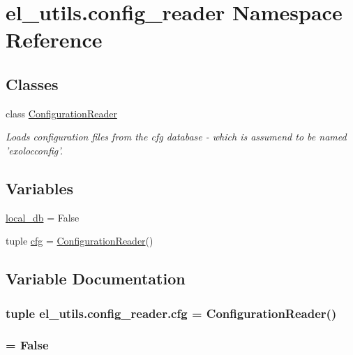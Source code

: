 \hypertarget{namespaceel__utils_1_1config__reader}{\section{el\-\_\-utils.\-config\-\_\-reader Namespace Reference}
\label{namespaceel__utils_1_1config__reader}
}
\subsection*{Classes}
\begin{DoxyCompactItemize}
\item 
class \hyperlink{classel__utils_1_1config__reader_1_1ConfigurationReader}{Configuration\-Reader}
\begin{DoxyCompactList}\small\item\em Loads configuration files from the cfg database -\/ which is assumend to be named 'exolocconfig'. \end{DoxyCompactList}\end{DoxyCompactItemize}
\subsection*{Variables}
\begin{DoxyCompactItemize}
\item 
\hyperlink{namespaceel__utils_1_1config__reader_a659c79c49945310345883c20baecf8ff}{local\-\_\-db} = False
\item 
tuple \hyperlink{namespaceel__utils_1_1config__reader_a4aa64edfeb4178f4197ce7d97aadcfbe}{cfg} = \hyperlink{classel__utils_1_1config__reader_1_1ConfigurationReader}{Configuration\-Reader}()
\end{DoxyCompactItemize}


\subsection{Variable Documentation}
\hypertarget{namespaceel__utils_1_1config__reader_a4aa64edfeb4178f4197ce7d97aadcfbe}{
\subsubsection[{cfg}]{\setlength{\rightskip}{0pt plus 5cm}tuple {\bf el\-\_\-utils.\-config\-\_\-reader.\-cfg} = {\bf Configuration\-Reader}()}}\label{namespaceel__utils_1_1config__reader_a4aa64edfeb4178f4197ce7d97aadcfbe}
\hypertarget{namespaceel__utils_1_1config__reader_a659c79c49945310345883c20baecf8ff}{
\subsubsection[{local\-\_\-db}]{ = False}}\label{namespaceel__utils_1_1config__reader_a659c79c49945310345883c20baecf8ff}
